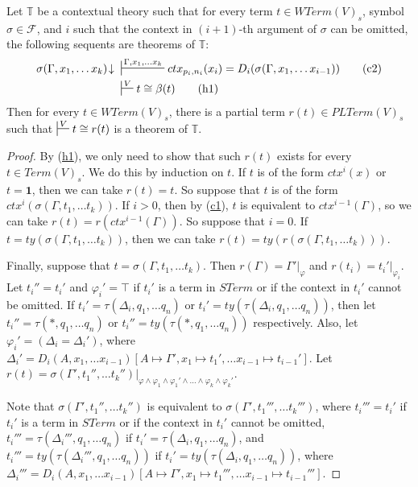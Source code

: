 \documentclass{elsarticle}
\newcommand{\axtag}[1]{\label{ax:#1} \tag{#1}}
\newcommand{\axref}[1]{(\hyperref[ax:#1]{#1})}
\theoremstyle{definition}
\theoremstyle{remark}
\newcommand{\emptyCtx}{\mathbf{1}}
\numberwithin{figure}{section}
\begin{document}
\begin{prop}
Let $\mathbb{T}$ be a contextual theory such that for every term $t \in WTerm(V)_s$, symbol $\sigma \in \mathcal{F}$,
    and $i$ such that the context in $(i+1)$-th argument of $\sigma$ can be omitted, the following sequents are theorems of $\mathbb{T}$:
\begin{align*}
\sigma(\Gamma, x_1, \ldots x_k)\!\downarrow\ & \sststile{}{\Gamma, x_1, \ldots x_k} ctx_{p_i,n_i}(x_i) = D_i(\sigma(\Gamma, x_1, \ldots x_{i-1})) \axtag{c2} \\
& \sststile{}{V} t \cong \beta(t) \axtag{h1}
\end{align*}
Then for every $t \in WTerm(V)_s$, there is a partial term $r(t) \in PLTerm(V)_s$ such that $\sststile{}{V} t \cong r(t)$ is a theorem of $\mathbb{T}$.
\end{prop}
\begin{proof}
By \axref{h1}, we only need to show that such $r(t)$ exists for every $t \in Term(V)_s$.
We do this by induction on $t$.
If $t$ is of the form $ctx^i(x)$ or $t = \emptyCtx$, then we can take $r(t) = t$.
So suppose that $t$ is of the form $ctx^i(\sigma(\Gamma, t_1, \ldots t_k))$.
If $i > 0$, then by \axref{c1}, $t$ is equivalent to $ctx^{i-1}(\Gamma)$, so we can take $r(t) = r(ctx^{i-1}(\Gamma))$.
So suppose that $i = 0$.
If $t = ty(\sigma(\Gamma, t_1, \ldots t_k))$, then we can take $r(t) = ty(r(\sigma(\Gamma, t_1, \ldots t_k)))$.

Finally, suppose that $t = \sigma(\Gamma, t_1, \ldots t_k)$.
Then $r(\Gamma) = \Gamma'|_\varphi$ and $r(t_i) = t_i'|_{\varphi_i}$.
Let $t_i'' = t_i'$ and $\varphi_i' = \top$ if $t_i'$ is a term in $STerm$ or if the context in $t_i'$ cannot be omitted.
If $t_i' = \tau(\Delta_i, q_1, \ldots q_n)$ or $t_i' = ty(\tau(\Delta_i, q_1, \ldots q_n))$,
    then let $t_i'' = \tau(*, q_1, \ldots q_n)$ or $t_i'' = ty(\tau(*, q_1, \ldots q_n))$ respectively.
Also, let $\varphi_i' = (\Delta_i = \Delta_i')$, where $\Delta_i' = D_i(A, x_1, \ldots x_{i-1})[A \mapsto \Gamma', x_1 \mapsto t_1', \ldots x_{i-1} \mapsto t_{i-1}']$.
Let $r(t) = \sigma(\Gamma', t_1'', \ldots t_k'')|_{\varphi \land \varphi_1 \land \varphi_1' \land \ldots \land \varphi_k \land \varphi_k'}$.

Note that $\sigma(\Gamma', t_1'', \ldots t_k'')$ is equivalent to $\sigma(\Gamma', t_1''', \ldots t_k''')$,
    where $t_i''' = t_i'$ if $t_i'$ is a term in $STerm$ or if the context in $t_i'$ cannot be omitted,
    $t_i''' = \tau(\Delta_i''', q_1, \ldots q_n)$ if $t_i' = \tau(\Delta_i, q_1, \ldots q_n)$, and
    $t_i''' = ty(\tau(\Delta_i''', q_1, \ldots q_n))$ if $t_i' = ty(\tau(\Delta_i, q_1, \ldots q_n))$,
    where $\Delta_i''' = D_i(A, x_1, \ldots x_{i-1})[A \mapsto \Gamma', x_1 \mapsto t_1''', \ldots x_{i-1} \allowbreak \mapsto t_{i-1}''']$.


\end{proof}
\end{document}
